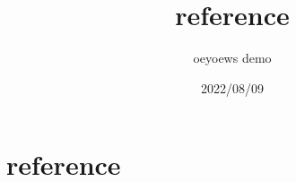 \documentclass{article}
\title{reference}
\author{oeyoews demo}
\date{2022/08/09}
\begin{document}
\maketitle


\section{reference}%
\label{sec:reference}



\end{document}

